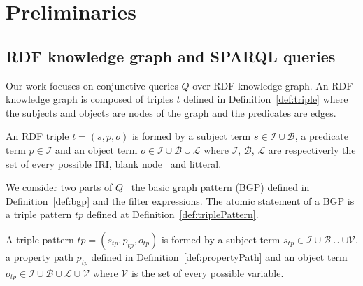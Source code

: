 \section{Preliminaries}





\subsection{RDF knowledge graph and SPARQL queries}
Our work focuses on conjunctive queries $Q$ over RDF knowledge graph.
An RDF knowledge graph is composed of triples $t$ defined in Definition~\ref{def:triple} where the subjects and objects are nodes of the graph and the predicates are edges.

\begin{definition}\label{def:triple}
    An RDF triple $t = (s,p,o)$ is formed by a  subject term $s \in \mathcal{I} \cup \mathcal{B}$, a predicate term  $p \in \mathcal{I}$ and an object term $o \in \mathcal{I} \cup \mathcal{B} \cup \mathcal{L}$
    where $\mathcal{I}$, $\mathcal{B}$, $\mathcal{L}$ are respectiverly the set of every possible IRI, blank node~ and litteral.
\end{definition}

We consider two parts of $Q$~ the basic graph pattern (BGP) defined in Definition~\ref{def:bgp} and the filter expressions.
The atomic statement of a BGP is a triple pattern $tp$ defined at Definition~\ref{def:triplePattern}.

\begin{definition}\label{def:triplePattern}
    A triple pattern $tp = (s_{tp},p_{tp},o_{tp})$ is formed by a subject term $s_{tp} \in \mathcal{I} \cup \mathcal{B} \cup \cup \mathcal{V}$, 
    a property path  $p_{tp}$ defined in Definition~\ref{def:propertyPath} and an object term  $o_{tp} \in \mathcal{I} \cup \mathcal{B} \cup \mathcal{L} \cup \mathcal{V}$ 
    where $\mathcal{V}$ is the set of every possible variable. 
\end{definition}


